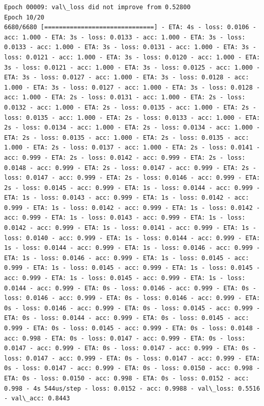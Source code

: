 \documentclass[11pt]{article}
\begin{document}
\begin{Verbatim}[commandchars=\\\{\}]
Epoch 00009: val\_loss did not improve from 0.52800
Epoch 10/20
6680/6680 [==============================] - ETA: 4s - loss: 0.0106 - acc: 1.000 - ETA: 3s - loss: 0.0133 - acc: 1.000 - ETA: 3s - loss: 0.0133 - acc: 1.000 - ETA: 3s - loss: 0.0131 - acc: 1.000 - ETA: 3s - loss: 0.0121 - acc: 1.000 - ETA: 3s - loss: 0.0120 - acc: 1.000 - ETA: 3s - loss: 0.0121 - acc: 1.000 - ETA: 3s - loss: 0.0125 - acc: 1.000 - ETA: 3s - loss: 0.0127 - acc: 1.000 - ETA: 3s - loss: 0.0128 - acc: 1.000 - ETA: 3s - loss: 0.0127 - acc: 1.000 - ETA: 3s - loss: 0.0128 - acc: 1.000 - ETA: 2s - loss: 0.0131 - acc: 1.000 - ETA: 2s - loss: 0.0132 - acc: 1.000 - ETA: 2s - loss: 0.0135 - acc: 1.000 - ETA: 2s - loss: 0.0135 - acc: 1.000 - ETA: 2s - loss: 0.0133 - acc: 1.000 - ETA: 2s - loss: 0.0134 - acc: 1.000 - ETA: 2s - loss: 0.0134 - acc: 1.000 - ETA: 2s - loss: 0.0135 - acc: 1.000 - ETA: 2s - loss: 0.0135 - acc: 1.000 - ETA: 2s - loss: 0.0137 - acc: 1.000 - ETA: 2s - loss: 0.0141 - acc: 0.999 - ETA: 2s - loss: 0.0142 - acc: 0.999 - ETA: 2s - loss: 0.0148 - acc: 0.999 - ETA: 2s - loss: 0.0147 - acc: 0.999 - ETA: 2s - loss: 0.0147 - acc: 0.999 - ETA: 2s - loss: 0.0146 - acc: 0.999 - ETA: 2s - loss: 0.0145 - acc: 0.999 - ETA: 1s - loss: 0.0144 - acc: 0.999 - ETA: 1s - loss: 0.0143 - acc: 0.999 - ETA: 1s - loss: 0.0142 - acc: 0.999 - ETA: 1s - loss: 0.0142 - acc: 0.999 - ETA: 1s - loss: 0.0142 - acc: 0.999 - ETA: 1s - loss: 0.0143 - acc: 0.999 - ETA: 1s - loss: 0.0142 - acc: 0.999 - ETA: 1s - loss: 0.0141 - acc: 0.999 - ETA: 1s - loss: 0.0140 - acc: 0.999 - ETA: 1s - loss: 0.0144 - acc: 0.999 - ETA: 1s - loss: 0.0144 - acc: 0.999 - ETA: 1s - loss: 0.0146 - acc: 0.999 - ETA: 1s - loss: 0.0146 - acc: 0.999 - ETA: 1s - loss: 0.0145 - acc: 0.999 - ETA: 1s - loss: 0.0145 - acc: 0.999 - ETA: 1s - loss: 0.0145 - acc: 0.999 - ETA: 1s - loss: 0.0145 - acc: 0.999 - ETA: 1s - loss: 0.0144 - acc: 0.999 - ETA: 0s - loss: 0.0146 - acc: 0.999 - ETA: 0s - loss: 0.0146 - acc: 0.999 - ETA: 0s - loss: 0.0146 - acc: 0.999 - ETA: 0s - loss: 0.0146 - acc: 0.999 - ETA: 0s - loss: 0.0145 - acc: 0.999 - ETA: 0s - loss: 0.0144 - acc: 0.999 - ETA: 0s - loss: 0.0145 - acc: 0.999 - ETA: 0s - loss: 0.0145 - acc: 0.999 - ETA: 0s - loss: 0.0148 - acc: 0.998 - ETA: 0s - loss: 0.0147 - acc: 0.999 - ETA: 0s - loss: 0.0147 - acc: 0.999 - ETA: 0s - loss: 0.0147 - acc: 0.999 - ETA: 0s - loss: 0.0147 - acc: 0.999 - ETA: 0s - loss: 0.0147 - acc: 0.999 - ETA: 0s - loss: 0.0147 - acc: 0.999 - ETA: 0s - loss: 0.0150 - acc: 0.998 - ETA: 0s - loss: 0.0150 - acc: 0.998 - ETA: 0s - loss: 0.0152 - acc: 0.998 - 4s 544us/step - loss: 0.0152 - acc: 0.9988 - val\_loss: 0.5516 - val\_acc: 0.8443


\end{Verbatim}
\end{document}
